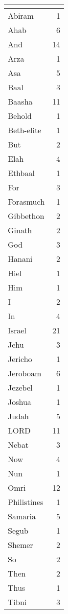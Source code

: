 \begin{center}
\begin{longtable}{l|r}
\hline \multicolumn{2}{c}{{ }} \\ \hline
\endfoot 
Abiram & 1\\ \hline 
Ahab & 6\\ \hline 
And & 14\\ \hline 
Arza & 1\\ \hline 
Asa & 5\\ \hline 
Baal & 3\\ \hline 
Baasha & 11\\ \hline 
Behold & 1\\ \hline 
Beth-elite & 1\\ \hline 
But & 2\\ \hline 
Elah & 4\\ \hline 
Ethbaal & 1\\ \hline 
For & 3\\ \hline 
Forasmuch & 1\\ \hline 
Gibbethon & 2\\ \hline 
Ginath & 2\\ \hline 
God & 3\\ \hline 
Hanani & 2\\ \hline 
Hiel & 1\\ \hline 
Him & 1\\ \hline 
I & 2\\ \hline 
In & 4\\ \hline 
Israel & 21\\ \hline 
Jehu & 3\\ \hline 
Jericho & 1\\ \hline 
Jeroboam & 6\\ \hline 
Jezebel & 1\\ \hline 
Joshua & 1\\ \hline 
Judah & 5\\ \hline 
LORD & 11\\ \hline 
Nebat & 3\\ \hline 
Now & 4\\ \hline 
Nun & 1\\ \hline 
Omri & 12\\ \hline 
Philistines & 1\\ \hline 
Samaria & 5\\ \hline 
Segub & 1\\ \hline 
Shemer & 2\\ \hline 
So & 2\\ \hline 
Then & 2\\ \hline 
Thus & 1\\ \hline 
Tibni & 3\\ \hline 

\end{longtable}
\end{center}
